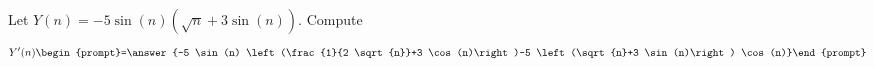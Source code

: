\documentclass{ximera}
\author{Bart Snapp}
\begin{document}
\begin{exercise}
Let $Y(n) = -5 \sin (n) \left(\sqrt{n}+3 \sin (n)\right)$. Compute
\[
Y'(n)
\begin{prompt}=\answer{-5 \sin (n) \left(\frac{1}{2 \sqrt{n}}+3 \cos (n)\right)-5 \left(\sqrt{n}+3 \sin (n)\right) \cos (n)}\end{prompt}
\]
\end{exercise}
\end{document}
